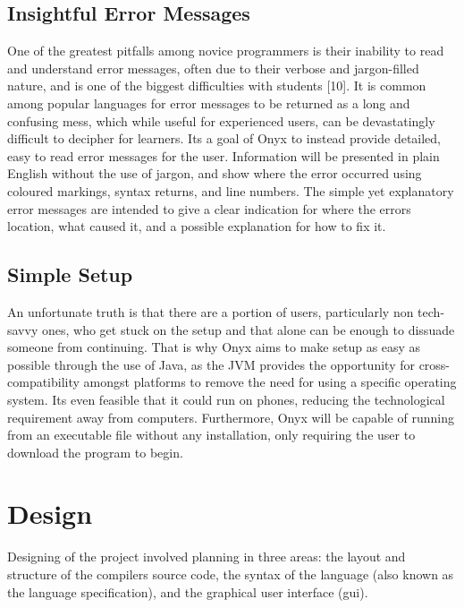 \documentclass[
]{report}
\begin{document}
\section{Insightful Error Messages}
One of the greatest pitfalls among novice programmers is their inability
to read and understand error messages, often due to their verbose and
jargon-filled nature, and is one of the biggest difficulties with
students {[}10{]}. It is common among popular languages for error
messages to be returned as a long and confusing mess, which while useful
for experienced users, can be devastatingly difficult to decipher for
learners. Its a goal of Onyx to instead provide detailed, easy to read
error messages for the user. Information will be presented in plain
English without the use of jargon, and show where the error occurred
using coloured markings, syntax returns, and line numbers. The simple
yet explanatory error messages are intended to give a clear indication
for where the errors location, what caused it, and a possible
explanation for how to fix it.

\section{Simple Setup}
An unfortunate truth is that there are a portion of users, particularly
non tech-savvy ones, who get stuck on the setup and that alone can be
enough to dissuade someone from continuing. That is why Onyx aims to
make setup as easy as possible through the use of Java, as the JVM
provides the opportunity for cross-compatibility amongst platforms to
remove the need for using a specific operating system. Its even feasible
that it could run on phones, reducing the technological requirement away
from computers. Furthermore, Onyx will be capable of running from an
executable file without any installation, only requiring the user to
download the program to begin.

\chapter{Design}
Designing of the project involved planning in three areas: the layout
and structure of the compilers source code, the syntax of the language
(also known as the language specification), and the graphical user
interface (\acrshort{gui}).
\end{document}
